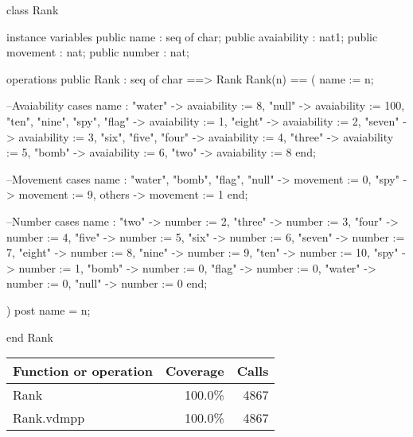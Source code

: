\begin{vdm_al}
class Rank

 instance variables
  public name : seq of char;
  public avaiability : nat1;
  public movement : nat;
  public number : nat;
 
 operations
  public Rank : seq of char ==> Rank
   Rank(n) ==
   ( 
    name := n;
    
    --Avaiability
    cases name :
     "water" -> avaiability := 8,
     "null" -> avaiability := 100,
     "ten", "nine", "spy", "flag" -> avaiability := 1,
     "eight" -> avaiability := 2,
     "seven" -> avaiability := 3,
     "six", "five", "four" -> avaiability := 4,
     "three" -> avaiability := 5,
     "bomb" -> avaiability := 6,
     "two" -> avaiability := 8
    end;
    
    --Movement
    cases name :
     "water", "bomb", "flag", "null" -> movement := 0,
     "spy" -> movement := 9,
     others -> movement := 1
    end;
    
    --Number
    cases name :
     "two" -> number := 2,
     "three" -> number := 3,
     "four" -> number := 4,
     "five" -> number := 5,
     "six" -> number := 6,
     "seven" -> number := 7,
     "eight" -> number := 8,
     "nine" -> number := 9,
     "ten" -> number := 10,
     "spy" -> number := 1,
     "bomb" -> number := 0,
     "flag" -> number := 0,
     "water" -> number := 0,
     "null" -> number := 0
    end;
   
   )
   post name = n;
   
end Rank
\end{vdm_al}
\bigskip
\begin{longtable}{|l|r|r|}
\hline
Function or operation & Coverage & Calls \\
\hline
\hline
Rank & 100.0\% & 4867 \\
\hline
\hline
Rank.vdmpp & 100.0\% & 4867 \\
\hline
\end{longtable}

